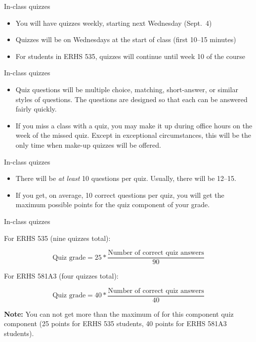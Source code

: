 \documentclass[
  10pt,
  ignorenonframetext,
]{beamer}
\providecommand{\tightlist}{%
  \setlength{\itemsep}{0pt}\setlength{\parskip}{0pt}}
\begin{document}
\begin{frame}{In-class quizzes}
\protect\hypertarget{in-class-quizzes}{}

\begin{itemize}
\tightlist
\item
  You will have quizzes weekly, starting next Wednesday (Sept.~4)
\item
  Quizzes will be on Wednesdays at the start of class (first 10--15
  minutes)
\item
  For students in ERHS 535, quizzes will continue until week 10 of the
  course
\end{itemize}

\end{frame}

\begin{frame}{In-class quizzes}
\protect\hypertarget{in-class-quizzes-1}{}

\begin{itemize}
\tightlist
\item
  Quiz questions will be multiple choice, matching, short-answer, or
  similar styles of questions. The questions are designed so that each
  can be answered fairly quickly.
\item
  If you miss a class with a quiz, you may make it up during office
  hours on the week of the missed quiz. Except in exceptional
  circumstances, this will be the only time when make-up quizzes will be
  offered.
\end{itemize}

\end{frame}

\begin{frame}{In-class quizzes}
\protect\hypertarget{in-class-quizzes-2}{}

\begin{itemize}
\tightlist
\item
  There will be \emph{at least} 10 questions per quiz. Usually, there
  will be 12--15.
\item
  If you get, on average, 10 correct questions per quiz, you will get
  the maximum possible points for the quiz component of your grade.
\end{itemize}

\end{frame}

\begin{frame}{In-class quizzes}
\protect\hypertarget{in-class-quizzes-3}{}

For ERHS 535 (nine quizzes total):

\[
\mbox{Quiz grade} = 25 * \frac{\mbox{Number of correct quiz answers}}{90}
\]

For ERHS 581A3 (four quizzes total):

\[
\mbox{Quiz grade} = 40 * \frac{\mbox{Number of correct quiz answers}}{40}
\]

\textbf{Note:} You can not get more than the maximum of for this
component quiz component (25 points for ERHS 535 students, 40 points for
ERHS 581A3 students).

\end{frame}
\end{document}
